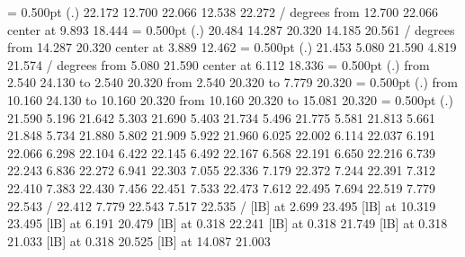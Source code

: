 \documentclass[10pt]{article}
\begin{document}
{%
%
\linethickness= 0.500pt
\setplotsymbol ({\thinlinefont .})
%
%
 22.172 12.700 22.066 12.538 22.272 /
%
 degrees from 12.700 22.066 center at  9.893 18.444
%
%
\linethickness= 0.500pt
\setplotsymbol ({\thinlinefont .})
%
 20.484 14.287 20.320 14.185 20.561 /
%
 degrees from 14.287 20.320 center at  3.889 12.462
%
%
\linethickness= 0.500pt
\setplotsymbol ({\thinlinefont .})
%
%
 21.453  5.080 21.590  4.819 21.574 /
%
 degrees from  5.080 21.590 center at  6.112 18.336
%
%
\linethickness= 0.500pt
\setplotsymbol ({\thinlinefont .})
\putrule from  2.540 24.130 to  2.540 20.320
\putrule from  2.540 20.320 to  7.779 20.320
%
%
\linethickness= 0.500pt
\setplotsymbol ({\thinlinefont .})
\putrule from 10.160 24.130 to 10.160 20.320
\putrule from 10.160 20.320 to 15.081 20.320
\linethickness= 0.500pt
\setplotsymbol ({\thinlinefont .})
%
%
 21.590 	 5.196 21.642
	 5.303 21.690
	 5.403 21.734
	 5.496 21.775
	 5.581 21.813
	 5.661 21.848
	 5.734 21.880
	 5.802 21.909
	 5.922 21.960
	 6.025 22.002
	 6.114 22.037
	 6.191 22.066
	 6.298 22.104
	 6.422 22.145
	 6.492 22.167
	 6.568 22.191
	 6.650 22.216
	 6.739 22.243
	 6.836 22.272
	 6.941 22.303
	 7.055 22.336
	 7.179 22.372
	 7.244 22.391
	 7.312 22.410
	 7.383 22.430
	 7.456 22.451
	 7.533 22.473
	 7.612 22.495
	 7.694 22.519
	 7.779 22.543
	/
%
%
 22.412  7.779 22.543  7.517 22.535 /
%
%
%
 [lB] at  2.699 23.495
%
%
 [lB] at 10.319 23.495
%
%
 [lB] at  6.191 20.479
%
%
 [lB] at  0.318 22.241
%
%
 [lB] at  0.318 21.749
%
%
 [lB] at  0.318 21.033
%
%
 [lB] at  0.318 20.525
%
%
 [lB] at 14.087 21.003
%
%
}
\end{document}
